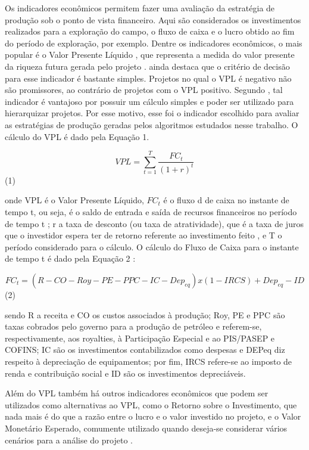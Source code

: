 Os indicadores econômicos permitem fazer uma avaliação da estratégia de produção sob o ponto de vista financeiro. Aqui são considerados os investimentos realizados para a exploração do campo, o fluxo de caixa e o lucro obtido ao fim do período de exploração, por exemplo. Dentre os indicadores econômicos, o mais popular é o Valor Presente Líquido \cite{Neves2004, Nogueira2009, Marques2012, Barreto2014}, que representa a medida do valor presente da riqueza futura gerada pelo projeto \cite{Puccini2011}.  ainda destaca que o critério de decisão para esse indicador é bastante simples. Projetos no qual o VPL é negativo não são promissores, ao contrário de projetos com o VPL positivo. Segundo , tal indicador é vantajoso por possuir um cálculo simples e poder ser utilizado para hierarquizar projetos. Por esse motivo, esse foi o indicador escolhido para avaliar as estratégias de produção geradas pelos algoritmos estudados nesse trabalho.  O cálculo do VPL é dado pela Equação 1.


$$ VPL = \sum_{t=1}^{T} \frac{FC_t}{(1+r)^t} $$ (1)

onde VPL é o Valor Presente Líquido, $FC_t$  é o fluxo d de caixa no instante de tempo t, ou seja, é o saldo de entrada e saída de recursos financeiros no período de tempo t \cite{Neves2004}; r a taxa de desconto (ou taxa de atratividade), que é a taxa de juros que o investidor espera ter de retorno referente ao investimento feito \cite{Puccini2011},  e T o período considerado para o cálculo. O cálculo do Fluxo de Caixa para o instante de tempo t é dado pela Equação 2 \cite{Silva2016}:

$$ FC_t = (R-CO-Roy-PE-PPC-IC- Dep_{eq} )x(1-IRCS)+ Dep_{eq} - ID $$ (2)
 
sendo R a receita e CO os custos associados à produção; Roy, PE e PPC são taxas cobrados pelo governo para a produção de petróleo e referem-se, respectivamente, aos royalties, à Participação Especial e ao PIS/PASEP e COFINS; IC são os investimentos contabilizados como despesas e DEPeq diz respeito à depreciação de equipamentos; por fim, IRCS refere-se ao imposto de renda e contribuição social e ID são os investimentos depreciáveis.

Além do VPL também há outros indicadores econômicos que podem ser utilizados como alternativas ao VPL, como o Retorno sobre o Investimento, que nada mais é do que a razão entre o lucro e o valor investido no projeto, e o Valor Monetário Esperado, comumente utilizado quando deseja-se considerar vários cenários para a análise do projeto \cite{Marques2012}.

